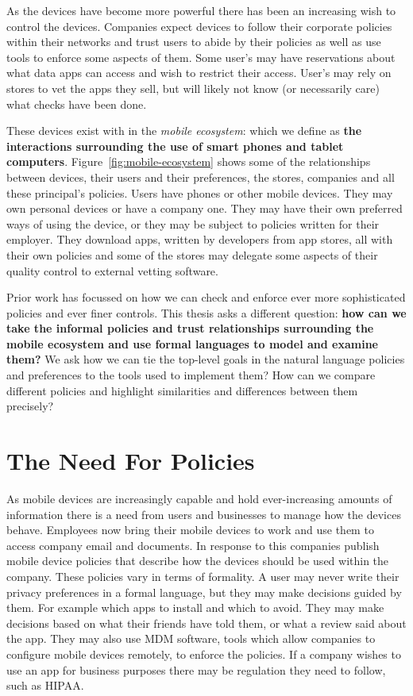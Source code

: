\documentclass[thesis.tex]{subfiles}
\begin{document}
As the devices have become more powerful there has been an increasing wish to
control the devices. Companies expect devices to follow their corporate policies
within their networks and trust users to abide by their policies as well as use
tools to enforce some aspects of them. Some user's may have reservations about
what data apps can access and wish to restrict their access. User's may rely on
stores to vet the apps they sell, but will likely not know (or necessarily care)
what checks have been done.

These devices exist with in the \emph{mobile ecosystem}: which we define as
\textbf{the interactions surrounding the use of smart phones and tablet
computers}. Figure~\ref{fig:mobile-ecosystem} shows some of the relationships
between devices, their users and their preferences, the stores, companies and
all these principal's policies. Users have phones or other mobile devices. They
may own personal devices or have a company one. They may have their own
preferred ways of using the device, or they may be subject to policies written
for their employer. They download apps, written by developers from app stores,
all with their own policies and some of the stores may delegate some aspects of
their quality control to external vetting software.

Prior work has focussed on how we can check and enforce ever more sophisticated
policies and ever finer controls. This thesis asks a different question:
\textbf{how can we take the informal policies and trust relationships
surrounding the mobile ecosystem and use formal languages to model and examine
them?} We ask how we can tie the top-level goals in the natural language
policies and preferences to the tools used to implement them? How can we compare
different policies and highlight similarities and differences between them
precisely?

\section{The Need For Policies}

As mobile devices are increasingly capable and hold ever-increasing amounts of
information there is a need from users and businesses to manage how the devices
behave. Employees now bring their mobile devices to work and use them to access
company email and documents. In response to this companies publish mobile device
policies that describe how the devices should be used within the company. These
policies vary in terms of formality. A user may never write their privacy
preferences in a formal language, but they may make decisions guided by them.
For example which apps to install and which to avoid. They may make decisions
based on what their friends have told them, or what a review said about the app.
They may also use \ac{MDM} software, tools which allow companies to configure
mobile devices remotely, to enforce the policies. If a company wishes to use an
app for business purposes there may be regulation they need to follow, such as
\ac{HIPAA}.
\end{document}
